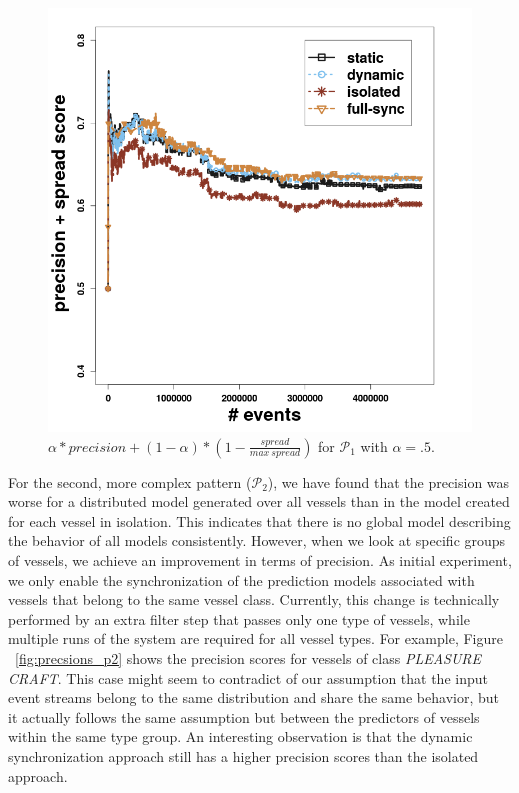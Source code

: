 \begin{center}
	\centering
	\begin{figure}[H]
		
		\includegraphics[width=\textwidth]{chapters/figures/synopses/p1_new_score_100_2_08.png}
		
		\caption{$ \alpha * precision + (1 - \alpha ) * ( 1- \frac{spread}{max\  spread})$ for $\mathcal{P}_1$ with $\alpha = .5$.}
		\label{fig:spread_prec}
	\end{figure}
\end{center}


\par For the second, more complex pattern ($\mathcal{P}_2$), we have found that the precision was worse for a distributed model generated over all vessels than in the model created for each vessel in isolation. This indicates that there is no global model describing the behavior of all models consistently. However, when we look at specific groups of vessels, we achieve an improvement in terms of precision. As initial experiment, we only enable the synchronization of the prediction models associated with vessels that belong to the same vessel class. Currently, this change is technically performed by an extra filter step that passes only one type of vessels, while multiple runs of the system are required for all vessel types. For example, Figure ~\ref{fig:precsions_p2} shows the precision scores for vessels of class \textit{PLEASURE CRAFT}. This case might seem to contradict of our assumption that the input event streams belong to the same distribution and share the same behavior, but it actually follows the same assumption but between the predictors of vessels within the same type group. An interesting observation is that the dynamic synchronization approach still has a higher precision scores than the isolated approach.

